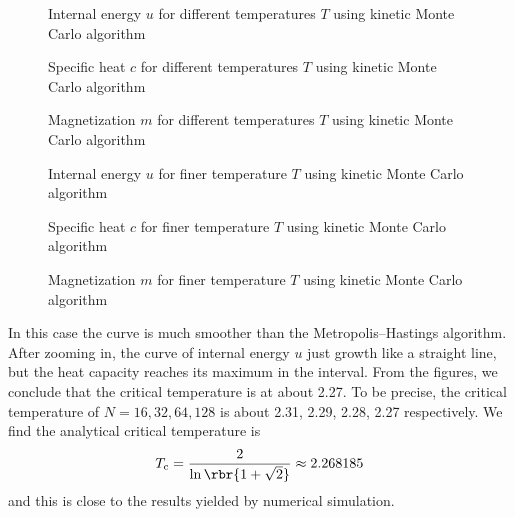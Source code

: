 \documentclass[english, nochinese]{pnote}
\begin{document}
\begin{figure}[htbp]
\centering
\scalebox{0.666}{}
\caption{Internal energy $u$ for different temperatures $T$ using kinetic Monte Carlo algorithm}
\label{Fig:HeatSmallKMC}
\end{figure}

\begin{figure}[htbp]
\centering
\scalebox{0.666}{}
\caption{Specific heat $c$ for different temperatures $T$ using kinetic Monte Carlo algorithm}
\label{Fig:CapSmallKMC}
\end{figure}

\begin{figure}[htbp]
\centering
\scalebox{0.666}{}
\caption{Magnetization $m$ for different temperatures $T$ using kinetic Monte Carlo algorithm}
\label{Fig:MagSmallKMC}
\end{figure}

\begin{figure}[htbp]
\centering
\scalebox{0.666}{}
\caption{Internal energy $u$ for finer temperature $T$ using kinetic Monte Carlo algorithm}
\label{Fig:HeatBigKMC}
\end{figure}

\begin{figure}[htbp]
\centering
\scalebox{0.666}{}
\caption{Specific heat $c$ for finer temperature $T$ using kinetic Monte Carlo algorithm}
\label{Fig:CapBigKMC}
\end{figure}

\begin{figure}[htbp]
\centering
\scalebox{0.666}{}
\caption{Magnetization $m$ for finer temperature $T$ using kinetic Monte Carlo algorithm}
\label{Fig:MagBigKMC}
\end{figure}

In this case the curve is much smoother than the Metropolis--Hastings algorithm. After zooming in, the curve of internal energy $u$ just growth like a straight line, but the heat capacity reaches its maximum in the interval. From the figures, we conclude that the critical temperature is at about 2.27. To be precise, the critical temperature of $ N = 16, 32, 64, 128 $ is about 2.31, 2.29, 2.28, 2.27 respectively. We find the analytical critical temperature is
\begin{equation}
T_{\text{c}} = \frac{2}{ \ln \rbr{ 1 + \sqrt{2} } } \approx 2.268185
\end{equation}
and this is close to the results yielded by numerical simulation.
\end{document}

